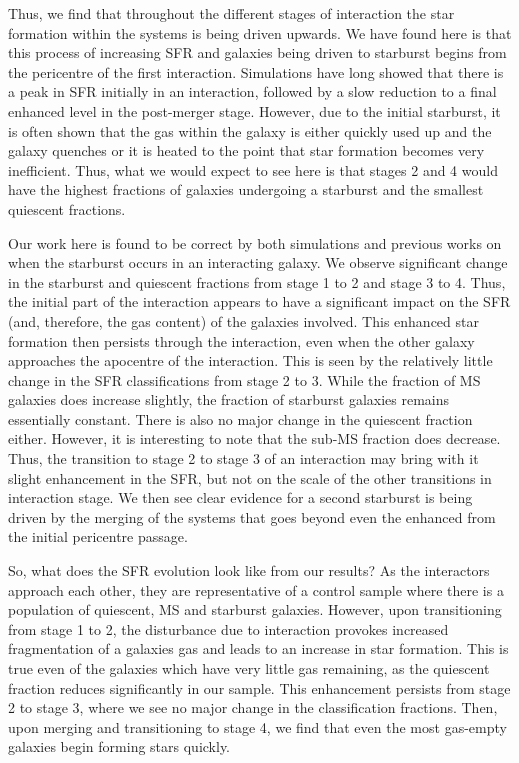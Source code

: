 \documentclass[fleqn,usenatbib]{mnras}
\begin{document}
Thus, we find that throughout the different stages of interaction the star formation within the systems is being driven upwards. We have found here is that this process of increasing SFR and galaxies being driven to starburst begins from the pericentre of the first interaction. Simulations have long showed that there is a peak in SFR initially in an interaction, followed by a slow reduction to a final enhanced level in the post-merger stage. However, due to the initial starburst, it is often shown that the gas within the galaxy is either quickly used up and the galaxy quenches or it is heated to the point that star formation becomes very inefficient. Thus, what we would expect to see here is that stages 2 and 4 would have the highest fractions of galaxies undergoing a starburst and the smallest quiescent fractions.

Our work here is found to be correct by both simulations and previous works on when the starburst occurs in an interacting galaxy. We observe significant change in the starburst and quiescent fractions from stage 1 to 2 and stage 3 to 4. Thus, the initial part of the interaction appears to have a significant impact on the SFR (and, therefore, the gas content) of the galaxies involved. This enhanced star formation then persists through the interaction, even when the other galaxy approaches the apocentre of the interaction. This is seen by the relatively little change in the SFR classifications from stage 2 to 3. While the fraction of MS galaxies does increase slightly, the fraction of starburst galaxies remains essentially constant. There is also no major change in the quiescent fraction either. However, it is interesting to note that the sub-MS fraction does decrease. Thus, the transition to stage 2 to stage 3 of an interaction may bring with it slight enhancement in the SFR, but not on the scale of the other transitions in interaction stage. We then see clear evidence for a second starburst is being driven by the merging of the systems that goes beyond even the enhanced from the initial pericentre passage. 

So, what does the SFR evolution look like from our results? As the interactors approach each other, they are representative of a control sample where there is a population of quiescent, MS and starburst galaxies. However, upon transitioning from stage 1 to 2, the disturbance due to interaction provokes increased fragmentation of a galaxies gas and leads to an increase in star formation. This is true even of the galaxies which have very little gas remaining, as the quiescent fraction reduces significantly in our sample. This enhancement persists from stage 2 to stage 3, where we see no major change in the classification fractions. Then, upon merging and transitioning to stage 4, we find that even the most gas-empty galaxies begin forming stars quickly. 
\end{document}

